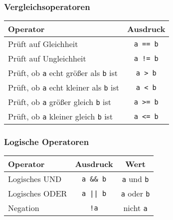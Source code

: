 \subsubsection{Vergleichsoperatoren}

\begin{table}[H]
  \centering
  \begin{tabular}{l c}
    \hline
    Operator & Ausdruck \\
    \hline
    Prüft auf Gleichheit & \verb|a == b|  \\
    Prüft auf Ungleichheit & \verb|a != b| \\
    Prüft, ob \verb|a| echt größer als \verb|b| ist & \verb|a > b| \\
    Prüft, ob \verb|a| echt kleiner als \verb|b| ist & \verb|a < b| \\
    Prüft, ob \verb|a| größer gleich \verb|b| ist & \verb|a >= b| \\
    Prüft, ob \verb|a| kleiner gleich \verb|b| ist & \verb|a <= b| \\
    \hline
  \end{tabular}
\end{table}

\subsubsection{Logische Operatoren}

\begin{table}[H]
  \centering
  \begin{tabular}{l c c}
    \hline
    Operator & Ausdruck & Wert \\
    \hline
    Logisches UND & \verb|a && b|  &   \verb|a| und \verb|b| \\

    Logisches ODER & \verb'a || b'  &   \verb|a| oder \verb|b| \\

    Negation      & \verb|!a|      &   nicht \verb|a| \\
    \hline
  \end{tabular}
\end{table}

